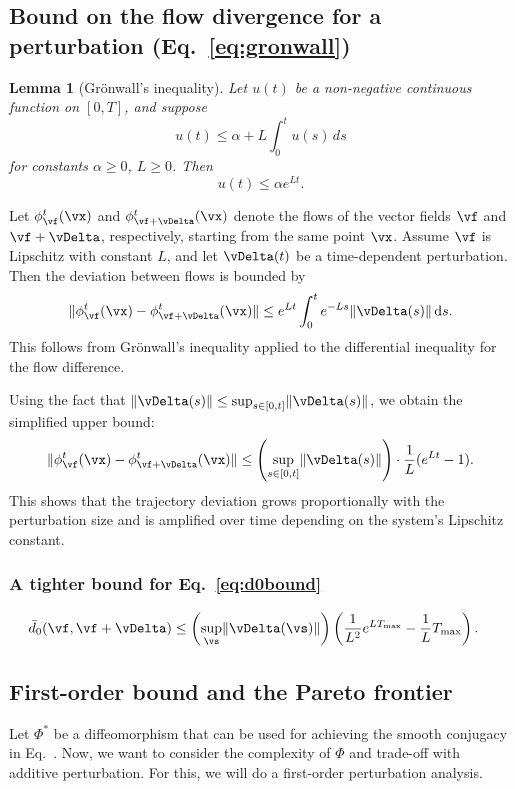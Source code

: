 \documentclass{article}
\newtheorem{lemma}{Lemma}
\theoremstyle{definition} \newtheorem{definition}{Definition}  \newtheorem{example}{Example}
\theoremstyle{remark} \newtheorem{remark}{Remark}
\renewcommand{\eqref}{Eq.~\originaleqref}
\newcounter{ct}
\DeclarePairedDelimiter{\norm}{\lVert}{\rVert}
\newcommand{\homeo}{\Phi} %
\begin{document}
\subsection{Bound on the flow divergence for a perturbation (Eq.~\ref{eq:gronwall})}\label{sec:flow_bound}
\begin{lemma}[Grönwall's inequality]
Let \( u(t) \) be a non-negative continuous function on \( [0, T] \), and suppose  
\[
u(t) \leq \alpha + L \int_0^t u(s)\, ds
\]
for constants \( \alpha \geq 0 \), \( L \geq 0 \). Then  
\[
u(t) \leq \alpha e^{Lt}.
\]
\end{lemma}


Let \( \phi^t_{\vf}(\vx) \) and \( \phi^t_{\vf + \vDelta}(\vx) \) denote the flows of the vector fields \( \vf \) and \( \vf + \vDelta \), respectively, starting from the same point \( \vx \). Assume \( \vf \) is Lipschitz with constant \( L \), and let \( \vDelta(t) \) be a time-dependent perturbation. Then the deviation between flows is bounded by
\[
\norm{ \phi^t_{\vf}(\vx) - \phi^t_{\vf + \vDelta}(\vx) }
\leq
e^{Lt} \int_0^{t} e^{-Ls} \norm{\vDelta(s)}\, \mathrm{d}s.
\]
This follows from Grönwall’s inequality applied to the differential inequality for the flow difference.

Using the fact that \( \norm{\vDelta(s)} \leq \sup_{s \in [0, t]} \norm{\vDelta(s)} \), we obtain the simplified upper bound:
\[
\norm{ \phi^t_{\vf}(\vx) - \phi^t_{\vf + \vDelta}(\vx) }
\leq
\left( \sup_{s \in [0, t]} \norm{\vDelta(s)} \right) \cdot \frac{1}{L}(e^{Lt} - 1).
\]
This shows that the trajectory deviation grows proportionally with the perturbation size and is amplified over time depending on the system's Lipschitz constant.


\subsubsection{A tighter bound for Eq.~\ref{eq:d0bound}}
\begin{align}\label{eq:d0bound_tight}
    \bar{d}_0(\vf, \vf + \vDelta)
    &\leq
    \left(\sup_\vs \norm{\vDelta(\vs)}\right) \left(\frac{1}{L^2} e^{LT_{\text{max}}} - \frac{1}{L}T_{\text{max}}\right).
\end{align}



\subsection{First-order bound and the Pareto frontier}\label{sec:fojac}
Let $\homeo^\ast$ be a diffeomorphism that can be used for achieving the smooth conjugacy in \eqref{eq:d1:tc}.
Now, we want to consider the complexity of $\homeo$ and trade-off with additive perturbation.
For this, we will do a first-order perturbation analysis.
\end{document}
